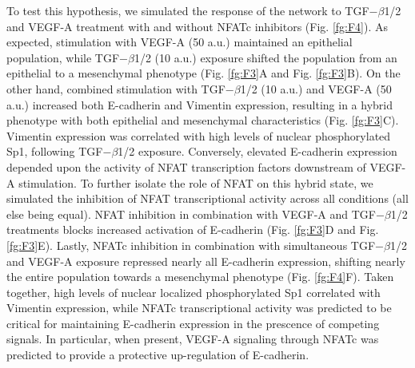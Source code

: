 \documentclass[12pt]{article}
\begin{document}

To test this hypothesis, we simulated the response of the network to TGF$-\beta$1/2 and VEGF-A treatment with and without NFATc inhibitors (Fig. \ref{fg:F4}).
As expected, stimulation with VEGF-A (50 a.u.) maintained an epithelial population, while TGF$-\beta$1/2 (10 a.u.) exposure shifted
the population from an epithelial to a mesenchymal phenotype (Fig. \ref{fg:F3}A and Fig. \ref{fg:F3}B).
On the other hand, combined stimulation with TGF$-\beta$1/2 (10 a.u.) and VEGF-A (50 a.u.) increased both E-cadherin and Vimentin expression, resulting in a hybrid phenotype with both epithelial and mesenchymal characteristics (Fig. \ref{fg:F3}C).
Vimentin expression was correlated with high levels of nuclear phosphorylated Sp1, following TGF$-\beta$1/2 exposure.
Conversely, elevated E-cadherin expression depended upon the activity of NFAT transcription factors downstream of VEGF-A stimulation.
To further isolate the role of NFAT on this hybrid state, we simulated the inhibition of NFAT transcriptional activity across all conditions (all else being equal).
NFAT inhibition in combination with VEGF-A and TGF$-\beta$1/2 treatments blocks increased activation of E-cadherin (Fig. \ref{fg:F3}D and Fig. \ref{fg:F3}E).
Lastly, NFATc inhibition in combination with simultaneous TGF$-\beta$1/2 and VEGF-A exposure repressed nearly all E-cadherin expression, shifting nearly the entire population towards a mesenchymal phenotype (Fig. \ref{fg:F4}F). Taken together, high levels of nuclear localized phosphorylated Sp1 correlated with Vimentin expression, while NFATc transcriptional activity was predicted to be critical for maintaining E-cadherin expression in the prescence of competing signals.
In particular, when present, VEGF-A signaling through NFATc was predicted to provide a protective up-regulation of E-cadherin.
\end{document}
